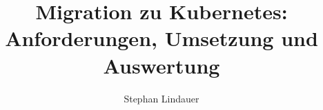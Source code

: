 \documentclass[master,german]{hgbthesis}
\title{Migration zu Kubernetes: Anforderungen, Umsetzung und Auswertung}
\author{Stephan Lindauer}
\begin{document}

\newcommand{\code}[1]{\colorbox{light-gray}{\texttt{#1}}}
\newcommand{\quotes}[1]{``#1''}

\frontmatter

\maketitle



\tableofcontents



\mainmatter








\appendix





\listoftables
\listoffigures

\MakeBibliography
\end{document}
